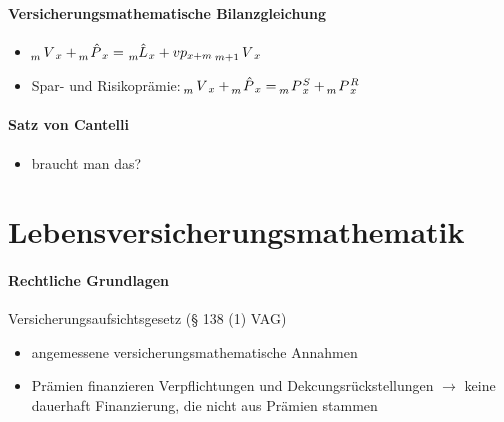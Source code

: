 \documentclass[12pt]{report}
\theoremstyle{dotless}
\theoremstyle{definition}
\begin{document}
\subsubsection{Versicherungsmathematische Bilanzgleichung}
\begin{itemize}
	\item $\tensor[_{m}]{V}{}_x + \tensor[_{m}]{\hat{P}}{}_x = \tensor[_{m}]{\hat{L}}{}_x + vp_{x+m} \ \tensor[_{m+1}]{V}{}_x$
	\item Spar- und Risikoprämie: $\tensor[_{m}]{V}{}_x + \tensor[_{m}]{\hat{P}}{}_x = \tensor[_{m}]{P}{}_x^S + \tensor[_{m}]{P}{}_x^R$
\end{itemize}

\subsubsection{Satz von Cantelli}
\begin{itemize}
	\item braucht man das?
\end{itemize}


































\chapter{Lebensversicherungsmathematik}

\subsubsection{Rechtliche Grundlagen}
Versicherungsaufsichtsgesetz (§ 138 (1) VAG)
\begin{itemize}
\item angemessene versicherungsmathematische Annahmen
\item Prämien finanzieren Verpflichtungen und Dekcungsrückstellungen $\rightarrow$ keine dauerhaft Finanzierung, die nicht aus Prämien stammen
\end{itemize}
\end{document}
